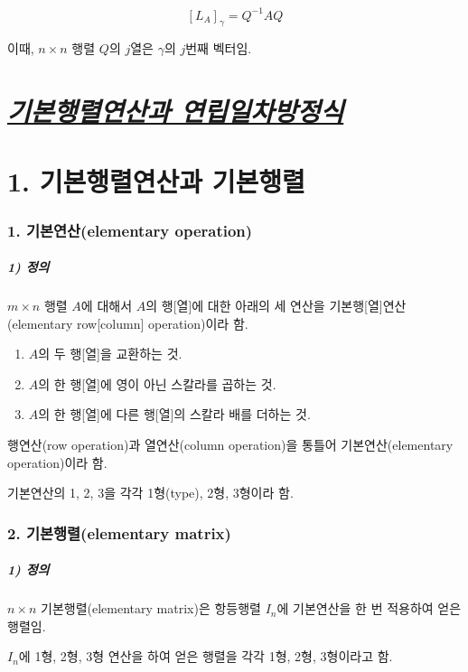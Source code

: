 \documentclass[10pt, a4paper]{article}
\begin{document}
\[
[L_A]_{\gamma}=Q^{-1}AQ
\]

이때, $n \times n$ 행렬 $Q$의 $j$열은 $\gamma$의 $j$번째 벡터임.


\newpage

\part{\textit{\underline{기본행렬연산과 연립일차방정식}}}
\part*{1. 기본행렬연산과 기본행렬}

\section*{1. 기본연산(elementary operation)}

\subsubsection*{1) 정의}
$m \times n$ 행렬 $A$에 대해서 $A$의 행[열]에 대한 아래의 세 연산을 기본행[열]연산(elementary row[column] operation)이라 함.

\begin{enumerate}
    \item $A$의 두 행[열]을 교환하는 것.
    \item $A$의 한 행[열]에 영이 아닌 스칼라를 곱하는 것.
    \item $A$의 한 행[열]에 다른 행[열]의 스칼라 배를 더하는 것.
\end{enumerate}

행연산(row operation)과 열연산(column operation)을 통틀어 기본연산(elementary operation)이라 함.

기본연산의 1, 2, 3을 각각 1형(type), 2형, 3형이라 함.\\


\section*{2. 기본행렬(elementary matrix)}

\subsubsection*{1) 정의}
$n \times n$ 기본행렬(elementary matrix)은 항등행렬 $I_n$에 기본연산을 한 번 적용하여 얻은 행렬임.

$I_n$에 1형, 2형, 3형 연산을 하여 얻은 행렬을 각각 1형, 2형, 3형이라고 함.
\end{document}
